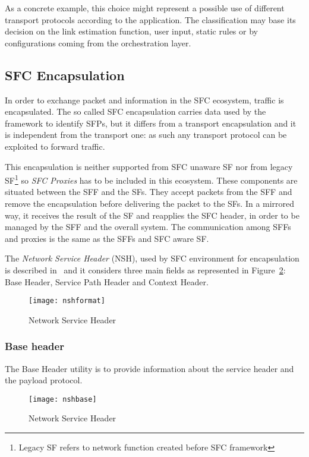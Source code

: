As a concrete example, this choice might represent a possible use of different
transport protocols according to the application. The classification may base
its decision on the link estimation function, user input, static rules or
by configurations coming from the orchestration layer.

\subsection{SFC Encapsulation}
In order to exchange packet and information in the SFC ecosystem, traffic is
encapsulated. The so called SFC encapsulation carries data used by the
framework to identify SFPs, but it differs from a transport encapsulation and it
is independent from the transport one: as such any transport protocol can be
exploited to forward traffic.

This encapsulation is neither supported from SFC unaware SF nor from legacy 
SF\footnote{Legacy SF refers to network function created before SFC framework}
so \emph{SFC Proxies} has to be included in this ecosystem. These components
are situated between the SFF and the SFs. They accept packets from the SFF and
remove the encapsulation before delivering the packet to the SFs. In a mirrored
way, it receives the result of the SF and reapplies the SFC header, in order to
be managed by the SFF and the overall system. The communication among SFFs and
proxies is the same as the SFFs and SFC aware SF.

The \emph{Network Service Header} (NSH), used by SFC environment for
encapsulation is described in~\cite{rfc8300} and it considers three main fields
as represented in Figure~\ref{chap:background:img:nshformat}: Base Header,
Service Path Header and Context Header.
\begin{figure}[H]
  \centering
  \texttt{[image: nshformat]}
  \caption[Network Service Header]{Network Service Header~\cite{rfc8300}}
  \label{chap:background:img:nshformat}
\end{figure}

\subsubsection{Base header}
The Base Header utility is to provide information about the service header and
the payload protocol.

\begin{figure}[H]
  \centering
  \texttt{[image: nshbase]}
  \caption[Network Service Header]{Network Service Header~\cite{rfc8300}}
  \label{chap:background:img:nshformat}
\end{figure}

